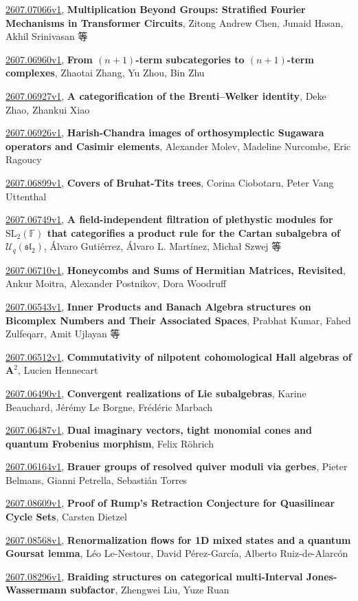 \documentclass[9pt, a4paper]{article}
\theoremstyle{plain}
\theoremstyle{definition}
\theoremstyle{remark}
\newcommand{\arxiv}[3]{\href{https://arxiv.org/abs/#1}{#1}, \textbf{\textcolor{arxivblue}{#2}}, #3}
\begin{document}
\arxiv{2607.07066v1}{Multiplication Beyond Groups: Stratified Fourier Mechanisms in Transformer Circuits}{Zitong Andrew Chen, Junaid Hasan, Akhil Srinivasan 等}

\arxiv{2607.06960v1}{From $(n+1)$-term subcategories to $(n+1)$-term complexes}{Zhaotai Zhang, Yu Zhou, Bin Zhu}

\arxiv{2607.06927v1}{A categorification of the Brenti--Welker identity}{Deke Zhao, Zhankui Xiao}

\arxiv{2607.06926v1}{Harish-Chandra images of orthosymplectic Sugawara operators and Casimir elements}{Alexander Molev, Madeline Nurcombe, Eric Ragoucy}

\arxiv{2607.06899v1}{Covers of Bruhat-Tits trees}{Corina Ciobotaru, Peter Vang Uttenthal}

\arxiv{2607.06749v1}{A field-independent filtration of plethystic modules for $\mathrm{SL}_2(\mathbb{F})$ that categorifies a product rule for the Cartan subalgebra of $\mathcal{U}_q(\mathfrak{sl}_2)$}{Álvaro Gutiérrez, Álvaro L. Martínez, Michał Szwej 等}

\arxiv{2607.06710v1}{Honeycombs and Sums of Hermitian Matrices, Revisited}{Ankur Moitra, Alexander Postnikov, Dora Woodruff}

\arxiv{2607.06543v1}{Inner Products and Banach Algebra structures on Bicomplex Numbers and Their Associated Spaces}{Prabhat Kumar, Fahed Zulfeqarr, Amit Ujlayan 等}

\arxiv{2607.06512v1}{Commutativity of nilpotent cohomological Hall algebras of $\mathbf{A}^2$}{Lucien Hennecart}

\arxiv{2607.06490v1}{Convergent realizations of Lie subalgebras}{Karine Beauchard, Jérémy Le Borgne, Frédéric Marbach}

\arxiv{2607.06487v1}{Dual imaginary vectors, tight monomial cones and quantum Frobenius morphism}{Felix Röhrich}

\arxiv{2607.06164v1}{Brauer groups of resolved quiver moduli via gerbes}{Pieter Belmans, Gianni Petrella, Sebastián Torres}

\arxiv{2607.08609v1}{Proof of Rump's Retraction Conjecture for Quasilinear Cycle Sets}{Carsten Dietzel}

\arxiv{2607.08568v1}{Renormalization flows for 1D mixed states and a quantum Goursat lemma}{Léo Le-Nestour, David Pérez-García, Alberto Ruiz-de-Alarcón}

\arxiv{2607.08296v1}{Braiding structures on categorical multi-Interval Jones-Wassermann subfactor}{Zhengwei Liu, Yuze Ruan}
\end{document}
